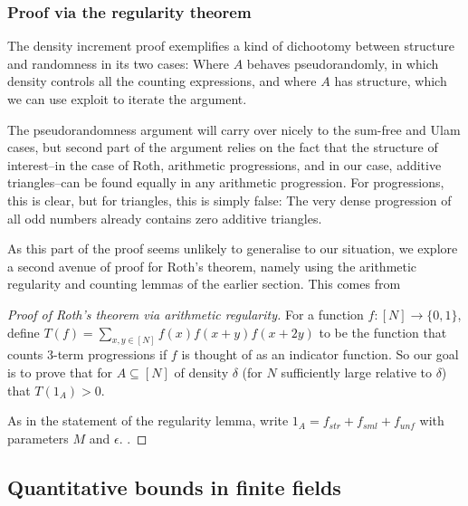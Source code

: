 \documentclass{article}
\theoremstyle{definition}
\theoremstyle{remark}
\numberwithin{equation}{section}
\begin{document}
{\color{red}

\subsubsection{Proof via the regularity theorem}

The density increment proof exemplifies a kind of dichootomy between
structure and randomness in its two cases: Where $A$ behaves
pseudorandomly, in which density controls all the counting
expressions, and where $A$ has structure, which we can use exploit to
iterate the argument.

The pseudorandomness argument will carry over nicely to the sum-free
and Ulam cases, but second part of the argument relies on the fact
that the structure of interest--in the case of Roth, arithmetic
progressions, and in our case, additive triangles--can be found
equally in any arithmetic progression.  For progressions, this is
clear, but for triangles, this is simply false: The very dense
progression of all odd numbers already contains zero additive
triangles.  

As this part of the proof seems unlikely to generalise to our
situation, we explore a second avenue of proof for Roth's theorem,
namely using the arithmetic regularity and counting lemmas of the
earlier section.  This comes from \cite{higher_fourier_analysis_tao}

\begin{proof}[Proof of Roth's theorem via arithmetic regularity]
  For a function $f : [N] \to \{0,1\}$, define
  $T(f) = \sum_{x,y \in [N]} f(x)f(x+y)f(x+2y)$ to be the function
  that counts 3-term progressions if $f$ is thought of as an indicator
  function.  So our goal is to prove that for $A \subseteq [N]$ of
  density $\delta$ (for $N$ sufficiently large relative to $\delta$)
  that $T(1_A) > 0$.  
  
  As in the statement of the regularity lemma, write
  $1_A = f_{str} + f_{sml} + f_{unf}$ with parameters $M$ and
  $\epsilon$.  .
\end{proof}

}
\subsection{Quantitative bounds in finite fields}
\end{document}
